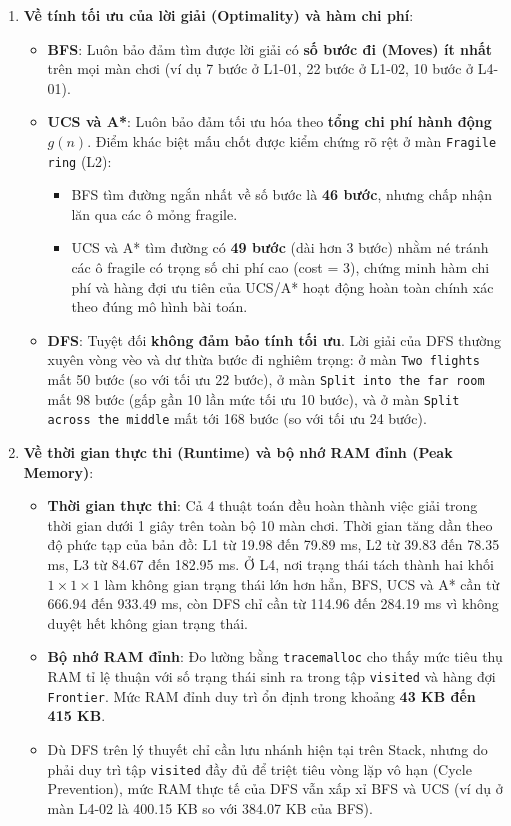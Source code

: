 \documentclass[12pt,a4paper]{article}
\begin{document}
\begin{enumerate}
    \item \textbf{Về tính tối ưu của lời giải (Optimality) và hàm chi phí}:
    \begin{itemize}
        \item \textbf{BFS}: Luôn bảo đảm tìm được lời giải có \textbf{số bước đi (Moves) ít nhất} trên mọi màn chơi (ví dụ 7 bước ở L1-01, 22 bước ở L1-02, 10 bước ở L4-01).
        \item \textbf{UCS và A*}: Luôn bảo đảm tối ưu hóa theo \textbf{tổng chi phí hành động $g(n)$}. Điểm khác biệt mấu chốt được kiểm chứng rõ rệt ở màn \texttt{Fragile ring} (L2):
        \begin{itemize}
            \item BFS tìm đường ngắn nhất về số bước là \textbf{46 bước}, nhưng chấp nhận lăn qua các ô mỏng fragile.
            \item UCS và A* tìm đường có \textbf{49 bước} (dài hơn 3 bước) nhằm né tránh các ô fragile có trọng số chi phí cao (cost = 3), chứng minh hàm chi phí và hàng đợi ưu tiên của UCS/A* hoạt động hoàn toàn chính xác theo đúng mô hình bài toán.
        \end{itemize}
        \item \textbf{DFS}: Tuyệt đối \textbf{không đảm bảo tính tối ưu}. Lời giải của DFS thường xuyên vòng vèo và dư thừa bước đi nghiêm trọng: ở màn \texttt{Two flights} mất 50 bước (so với tối ưu 22 bước), ở màn \texttt{Split into the far room} mất 98 bước (gấp gần 10 lần mức tối ưu 10 bước), và ở màn \texttt{Split across the middle} mất tới 168 bước (so với tối ưu 24 bước).
    \end{itemize}

    \item \textbf{Về thời gian thực thi (Runtime) và bộ nhớ RAM đỉnh (Peak Memory)}:
    \begin{itemize}
        \item \textbf{Thời gian thực thi}: Cả 4 thuật toán đều hoàn thành việc giải trong thời gian dưới 1 giây trên toàn bộ 10 màn chơi. Thời gian tăng dần theo độ phức tạp của bản đồ: L1 từ 19.98 đến 79.89 ms, L2 từ 39.83 đến 78.35 ms, L3 từ 84.67 đến 182.95 ms. Ở L4, nơi trạng thái tách thành hai khối $1 \times 1 \times 1$ làm không gian trạng thái lớn hơn hẳn, BFS, UCS và A* cần từ 666.94 đến 933.49 ms, còn DFS chỉ cần từ 114.96 đến 284.19 ms vì không duyệt hết không gian trạng thái.
        \item \textbf{Bộ nhớ RAM đỉnh}: Đo lường bằng \texttt{tracemalloc} cho thấy mức tiêu thụ RAM tỉ lệ thuận với số trạng thái sinh ra trong tập \texttt{visited} và hàng đợi \texttt{Frontier}. Mức RAM đỉnh duy trì ổn định trong khoảng \textbf{43 KB đến 415 KB}. 
        \item Dù DFS trên lý thuyết chỉ cần lưu nhánh hiện tại trên Stack, nhưng do phải duy trì tập \texttt{visited} đầy đủ để triệt tiêu vòng lặp vô hạn (Cycle Prevention), mức RAM thực tế của DFS vẫn xấp xỉ BFS và UCS (ví dụ ở màn L4-02 là 400.15 KB so với 384.07 KB của BFS).
    \end{itemize}
\end{enumerate}
\end{document}
